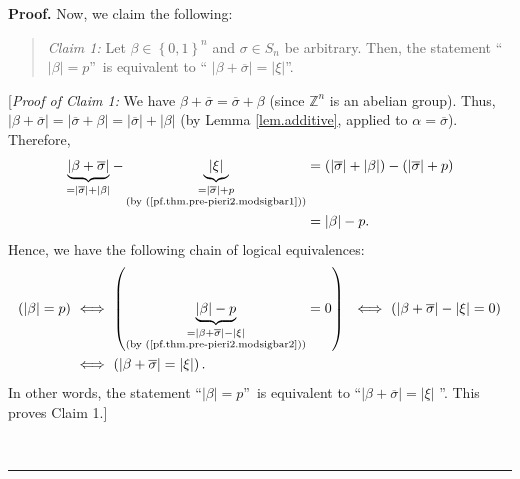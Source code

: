 \documentclass[numbers=enddot,12pt,final,onecolumn,notitlepage,english]{scrartcl}%
\theoremstyle{definition}
\newenvironment{statement}{\begin{quote}}{\end{quote}}
\newenvironment{proof}[1][Proof]{\noindent\textbf{#1.} }{\ \rule{0.5em}{0.5em}}
\newenvironment{verlong}{}{}
\begin{document}
\begin{verlong}
\begin{proof}
Now, we claim the following:

\begin{statement}
\textit{Claim 1:} Let $\beta\in\left\{  0,1\right\}  ^{n}$ and $\sigma\in
S_{n}$ be arbitrary. Then, the statement \textquotedblleft$\left\vert
\beta\right\vert =p$\textquotedblright\ is equivalent to \textquotedblleft%
$\left\vert \beta+\overline{\sigma}\right\vert =\left\vert \xi\right\vert
$\textquotedblright.
\end{statement}

[\textit{Proof of Claim 1:} We have $\beta+\overline{\sigma}=\overline{\sigma
}+\beta$ (since $\mathbb{Z}^{n}$ is an abelian group). Thus, $\left\vert
\beta+\overline{\sigma}\right\vert =\left\vert \overline{\sigma}%
+\beta\right\vert =\left\vert \overline{\sigma}\right\vert +\left\vert
\beta\right\vert $ (by Lemma \ref{lem.additive}, applied to $\alpha
=\overline{\sigma}$). Therefore,%
\begin{align}
\underbrace{\left\vert \beta+\overline{\sigma}\right\vert }_{=\left\vert
\overline{\sigma}\right\vert +\left\vert \beta\right\vert }%
-\underbrace{\left\vert \xi\right\vert }_{\substack{=\left\vert \overline
{\sigma}\right\vert +p\\\text{(by (\ref{pf.thm.pre-pieri2.modsigbar1}))}}}  &
=\left(  \left\vert \overline{\sigma}\right\vert +\left\vert \beta\right\vert
\right)  -\left(  \left\vert \overline{\sigma}\right\vert +p\right)
\nonumber\\
&  =\left\vert \beta\right\vert -p. \label{pf.thm.pre-pieri2.modsigbar2}%
\end{align}
Hence, we have the following chain of logical equivalences:%
\begin{align*}
\left(  \left\vert \beta\right\vert =p\right)  \  &  \Longleftrightarrow
\ \left(  \underbrace{\left\vert \beta\right\vert -p}_{\substack{=\left\vert
\beta+\overline{\sigma}\right\vert -\left\vert \xi\right\vert \\\text{(by
(\ref{pf.thm.pre-pieri2.modsigbar2}))}}}=0\right)  \ \ \Longleftrightarrow
\ \left(  \left\vert \beta+\overline{\sigma}\right\vert -\left\vert
\xi\right\vert =0\right) \\
&  \Longleftrightarrow\ \left(  \left\vert \beta+\overline{\sigma}\right\vert
=\left\vert \xi\right\vert \right)  .
\end{align*}
In other words, the statement \textquotedblleft$\left\vert \beta\right\vert
=p$\textquotedblright\ is equivalent to \textquotedblleft$\left\vert
\beta+\overline{\sigma}\right\vert =\left\vert \xi\right\vert $%
\textquotedblright. This proves Claim 1.] \medskip


\end{proof}
\end{verlong}
\end{document}
